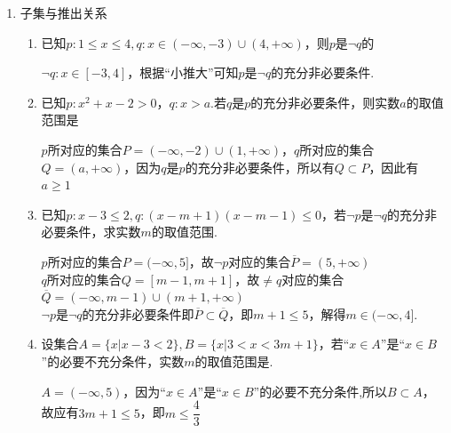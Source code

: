 \begin{enumerate}
\begin{enumerate}
    \begin{jieda}
        “$x+y \neq 5$”对应了平面上除直线$x + y = 5$以外的区域 \\
        “$x \neq 2 \mbox{且} y \neq 3$”对应了平面上除直线$x = 2$和直线$y = 3$以外的区域
    \end{jieda}
    \item 已知$p$是$r$的充分非必要条件，$s$是$r$的必要条件，$q$是$s$的必要条件，那么$p$是$q$的条件
    \begin{jieda}
        $p \Rightarrow r \Rightarrow s \Rightarrow q$，且$r \nRightarrow p$
    \end{jieda}
\end{enumerate}
\item 子集与推出关系
\begin{enumerate}
    \item 已知$p: 1 \leq x \leq 4, q: x \in (-\infty, -3) \cup (4, +\infty)$，则$p$是$\neg{q}$的
    \begin{jieda}
        $\neg{q}: x \in [-3, 4]$，根据“小推大”可知$p$是$\neg{q}$的充分非必要条件.
    \end{jieda}
    \item 已知$p: x^2 +x - 2 > 0$，$q: x > a$.若$q$是$p$的充分非必要条件，则实数$a$的取值范围是\blkda{$[1, +\infty)$}
    \begin{jieda}
        $p$所对应的集合$P = (-\infty, -2) \cup (1, +\infty)$，$q$所对应的集合$Q = (a, +\infty)$，因为$q$是$p$的充分非必要条件，所以有$Q \subset P$，因此有$a \geq 1$
    \end{jieda}
    \item 已知$p: x-3 \leq 2, q: (x-m+1)(x-m-1) \leq 0$，若$\neg p$是$\neg q$的充分非必要条件，求实数$m$的取值范围.
    \begin{jieda}
        $p$所对应的集合$P = (-\infty, 5]$，故$\neg p$对应的集合$\overline{P} = (5, +\infty)$ \\
        $q$所对应的集合$Q = [m-1, m+1]$，故$\neq q$对应的集合$\overline{Q} = (-\infty, m-1) \cup (m+1, +\infty)$ \\
        $\neg p$是$\neg q$的充分非必要条件即$\overline{P} \subset \overline{Q}$，即$m+1 \leq 5$，解得$m \in (-\infty, 4]$.
    \end{jieda}
    \item 设集合$A = \{x | x-3 < 2\}, B = \{x |3 < x < 3m+1\}$，若“$x \in A$”是“$x \in B$”的必要不充分条件，实数$m$的取值范围是\blkda{$\left(-\infty, \dfrac{4}{3}\right]$}.
    \begin{jieda}
        $A = (-\infty, 5)$，因为“$x \in A$”是“$x \in B$”的必要不充分条件,所以$B \subset A$，故应有$3m+1 \leq 5$，即$m \leq \dfrac{4}{3}$
    \end{jieda}
\end{enumerate}


\end{enumerate}
